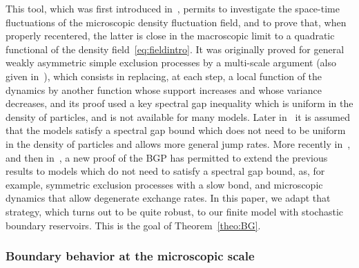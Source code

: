 \documentclass[10pt]{amsart}
\theoremstyle{definition}\newtheorem{defi}[theo]{Definition}\newtheorem{rema}[theo]{Remark}\newtheorem{exam}[theo]{Example}\newtheorem{exem}[theo]{Example}\newtheorem{nota}[theo]{Notation}
\begin{document}
This tool, which was first introduced in~\cite{gj2014}, permits to investigate the space-time fluctuations of the microscopic density fluctuation field, and to prove that, when properly recentered, the latter is close in the macroscopic limit to a quadratic functional of the density field~\eqref{eq:fieldintro}. It was originally proved for general weakly asymmetric simple exclusion processes by a multi-scale argument (also given in~\cite{G}), which consists in replacing, at each step, a local function of the dynamics by another function whose support increases and whose variance decreases, and its proof used a key spectral gap inequality which is uniform in the density of particles, and is not available for many models. Later in~\cite{GJS} it is assumed that the models satisfy a spectral gap bound which does not need to be uniform in the density of particles and allows more general jump rates. More recently in~\cite{fgsimon2015,GJSi}, and then in~\cite{blondel2016}, a new proof of the BGP has permitted to extend the previous results to models which do not need to satisfy a spectral gap bound, as, for example, symmetric exclusion processes with a slow bond, and microscopic dynamics that allow degenerate exchange rates. In this paper, we adapt that strategy, which turns out to be quite robust, to our finite model with stochastic boundary reservoirs. This is the goal of Theorem~\ref{theo:BG}.


\subsubsection{Boundary behavior at the microscopic scale}
\end{document}

